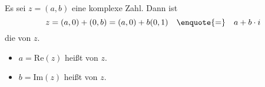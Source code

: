 Es sei $z = (a, b)$ eine komplexe Zahl. Dann ist
$$z = (a, 0) + (0, b) = (a, 0) + b(0, 1) \quad \text{\enquote{=}} \quad a + b \cdot i$$
die  von $z$.
\begin{itemize}
    \item $a = \text{Re}(z)$ heißt  von $z$.
    \item $b = \text{Im}(z)$ heißt  von $z$.
\end{itemize}